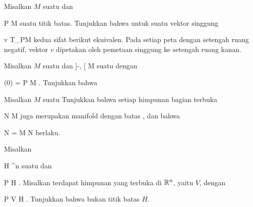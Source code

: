 {}
{

Misalkan $M$ suatu
dan

\mavergleichskette
{\vergleichskette
{ P
}
{ \in }{ \partial M
}
{  }{
}
{    }{
}
{   }{
}
}
{}{}{}
suatu titik batas. Tunjukkan bahwa untuk suatu vektor singgung

\mavergleichskette
{\vergleichskette
{ v
}
{ \in }{ T_PM
}
{  }{
}
{    }{
}
{   }{
}
}
{}{}{}
kedua sifat berikut ekuivalen.
 {Pada setiap peta dengan setengah ruang negatif, vektor $v$ dipetakan oleh pemetaan singgung ke setengah ruang kanan.
}

}
{} {}

{}
{

Misalkan $M$ suatu
dan
\maabbdisp {\gamma} {{]{-\epsilon}, \epsilon[}} {M
} {}
suatu
dengan

\mavergleichskettedisp
{\vergleichskette
{ \gamma (0)
}
{ =} { P
}
{ \in} { \partial M
}
{ } {
}
{ } {
}
}
{}{}{.}
Tunjukkan bahwa

}
{} {}

{}
{

Misalkan $M$ suatu
Tunjukkan bahwa setiap himpunan bagian terbuka

\mavergleichskette
{\vergleichskette
{ N
}
{ \subseteq }{ M
}
{  }{
}
{    }{
}
{   }{
}
}
{}{}{}
juga merupakan manifold dengan batas
 {} {,}
dan bahwa

\mavergleichskettedisp
{\vergleichskette
{ \partial N
}
{ =} { \partial M \cap N
}
{ } {
}
{ } {
}
{ } {
}
}
{}{}{}
berlaku.

}
{} {}

{}
{

Misalkan

\mavergleichskette
{\vergleichskette
{ H
}
{ \subseteq }{ \R^n
}
{  }{
}
{    }{
}
{   }{
}
}
{}{}{}
suatu
dan

\mavergleichskette
{\vergleichskette
{ P
}
{ \in }{ H
}
{  }{
}
{    }{
}
{   }{
}
}
{}{}{.}
Misalkan terdapat himpunan yang terbuka di ${\mathbb R}^n$, yaitu $V$, dengan

\mavergleichskette
{\vergleichskette
{ P
}
{ \in }{ V
}
{ \subseteq }{ H
}
{    }{
}
{   }{
}
}
{}{}{.}
Tunjukkan bahwa
 bukan titik batas $H$.

}
{} {}

